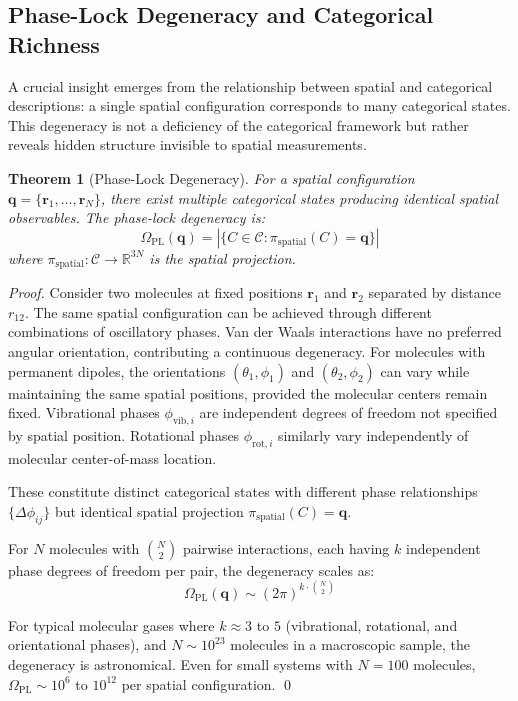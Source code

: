 \documentclass[12pt,a4paper]{article}
\newtheorem{theorem}{Theorem}[section]
\theoremstyle{definition}
\theoremstyle{remark}
\newcommand{\catspace}{\mathcal{C}}
\begin{document}
\subsection{Phase-Lock Degeneracy and Categorical Richness}

A crucial insight emerges from the relationship between spatial and categorical descriptions: a single spatial configuration corresponds to many categorical states. This degeneracy is not a deficiency of the categorical framework but rather reveals hidden structure invisible to spatial measurements.

\begin{theorem}[Phase-Lock Degeneracy]
\label{thm:phase_lock_degeneracy}
For a spatial configuration $\mathbf{q} = \{\mathbf{r}_1, \ldots, \mathbf{r}_N\}$, there exist multiple categorical states producing identical spatial observables. The phase-lock degeneracy is:
\begin{equation}
\Omega_{\text{PL}}(\mathbf{q}) = |\{C \in \catspace : \pi_{\text{spatial}}(C) = \mathbf{q}\}|
\label{eq:phase_lock_degeneracy}
\end{equation}
where $\pi_{\text{spatial}}: \catspace \to \mathbb{R}^{3N}$ is the spatial projection.
\end{theorem}

\begin{proof}
Consider two molecules at fixed positions $\mathbf{r}_1$ and $\mathbf{r}_2$ separated by distance $r_{12}$. The same spatial configuration can be achieved through different combinations of oscillatory phases. Van der Waals interactions have no preferred angular orientation, contributing a continuous degeneracy. For molecules with permanent dipoles, the orientations $(\theta_1, \phi_1)$ and $(\theta_2, \phi_2)$ can vary while maintaining the same spatial positions, provided the molecular centers remain fixed. Vibrational phases $\phi_{\text{vib},i}$ are independent degrees of freedom not specified by spatial position. Rotational phases $\phi_{\text{rot},i}$ similarly vary independently of molecular center-of-mass location.

These constitute distinct categorical states with different phase relationships $\{\Delta\phi_{ij}\}$ but identical spatial projection $\pi_{\text{spatial}}(C) = \mathbf{q}$.

For $N$ molecules with $\binom{N}{2}$ pairwise interactions, each having $k$ independent phase degrees of freedom per pair, the degeneracy scales as:
\begin{equation}
\Omega_{\text{PL}}(\mathbf{q}) \sim (2\pi)^{k \cdot \binom{N}{2}}
\end{equation}

For typical molecular gases where $k \approx 3$ to $5$ (vibrational, rotational, and orientational phases), and $N \sim 10^{23}$ molecules in a macroscopic sample, the degeneracy is astronomical. Even for small systems with $N = 100$ molecules, $\Omega_{\text{PL}} \sim 10^6$ to $10^{12}$ per spatial configuration. \qed
\end{proof}
\end{document}
